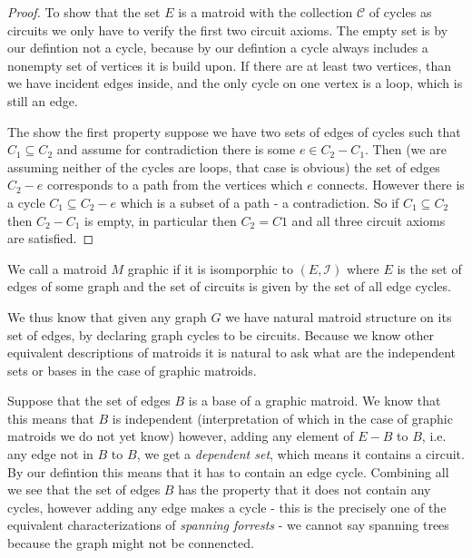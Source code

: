 \begin{proof}
To show that the set $E$ is a matroid with the collection $\mathcal{C}$ of cycles as circuits we only have to verify the first two circuit axioms. The empty set is by our defintion not a cycle, because by our defintion a cycle always includes a nonempty set of vertices it is build upon. If there are at least two vertices, than we have incident edges inside, and the only cycle on one vertex is a loop, which is still an edge.

The show the first property suppose we have two sets of edges of cycles such that $C_1 \subseteq C_2$ and assume for contradiction there is some $e \in C_2 - C_1$. Then (we are assuming neither of the cycles are loops, that case is obvious) the set of edges $C_2 - e$ corresponds to a path from the vertices which $e$ connects. However there is a cycle $C_1 \subseteq C_2 -e$ which is a subset of a path - a contradiction. So if $C_1 \subseteq C_2$ then $C_2 - C_1$ is empty, in particular then $C_2 = C1$ and all three circuit axioms are satisfied.



\end{proof}

\begin{defn}
    We call a matroid $M$ graphic if it is isomporphic to $(E, \mathcal{I})$ where $E$ is the set of edges of some graph and the set of circuits is given by the set of all edge cycles.
\end{defn}

We thus know that given any graph $G$ we have natural matroid structure on its set of edges, by declaring graph cycles to be circuits. Because we know other equivalent descriptions of matroids it is natural to ask what are the independent sets or bases in the case of graphic matroids. 

Suppose that the set of edges $B$ is a base of a graphic matroid. We know that this means that $B$ is independent (interpretation of which in the case of graphic matroids we do not yet know) however, adding any element of $E-B$ to $B$, i.e. any edge not in $B$ to $B$, we get a \textit{dependent set}, which means it contains a circuit. By our defintion this means that it has to contain an edge cycle. Combining all we see that the set of edges $B$ has the property that it does not contain any cycles, however adding any edge makes a cycle - this is the precisely one of the equivalent characterizations of \textit{spanning forrests} - we cannot say spanning trees because the graph might not be connencted. 


